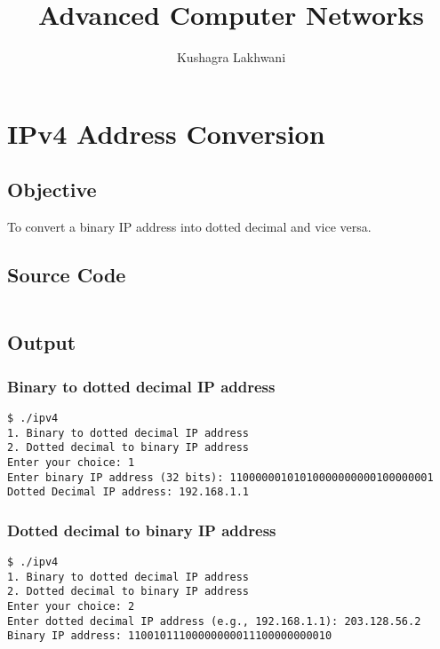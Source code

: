 \documentclass{korigamik}
\title{Advanced Computer Networks}
\author{Kushagra Lakhwani}
\begin{document}
\maketitle
\newpage



\thispagestyle{empty}
\tableofcontents
\newpage

\section{IPv4 Address Conversion}
\label{sec:ipv4}
\subsection{Objective}
To convert a binary IP address into dotted decimal and vice versa.
\subsection{Source Code}
\inputminted[firstline=5, lastline=39]{cpp}{code/ipv4.cpp}
\subsection{Output}

\subsubsection{Binary to dotted decimal IP address}
\begin{lstlisting}[style=output]
$ ./ipv4
1. Binary to dotted decimal IP address
2. Dotted decimal to binary IP address
Enter your choice: 1
Enter binary IP address (32 bits): 11000000101010000000000100000001
Dotted Decimal IP address: 192.168.1.1
\end{lstlisting}

\subsubsection{Dotted decimal to binary IP address}

\begin{lstlisting}[style=output]
$ ./ipv4
1. Binary to dotted decimal IP address
2. Dotted decimal to binary IP address
Enter your choice: 2
Enter dotted decimal IP address (e.g., 192.168.1.1): 203.128.56.2
Binary IP address: 11001011100000000011100000000010
\end{lstlisting}

\pagebreak
\end{document}

